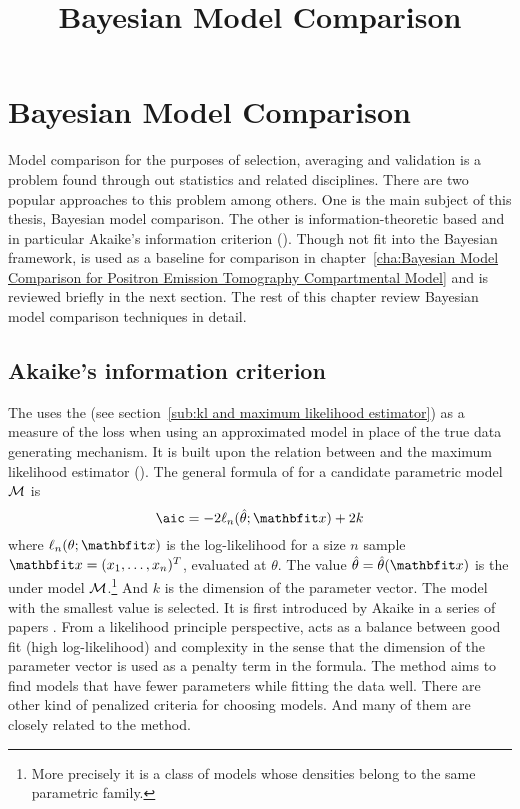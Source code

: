 \ifx\inthesis\undefined %

\title{Bayesian Model Comparison}

\maketitle
\else %
\chapter{Bayesian Model Comparison}
\label{cha:Bayesian Model Comparison}
\fi %

Model comparison for the purposes of selection, averaging and validation is a
problem found through out statistics and related disciplines. There are two
popular approaches to this problem among others. One is the main subject of
this thesis, Bayesian model comparison. The other is information-theoretic
based and in particular Akaike's information criterion (\aic). Though not fit
into the Bayesian framework, \aic is used as a baseline for comparison in
chapter~\ref{cha:Bayesian Model Comparison for Positron Emission Tomography
  Compartmental Model} and is reviewed briefly in the next section. The rest
of this chapter review Bayesian model comparison techniques in detail.

\section{Akaike's information criterion}
\label{sec:Akaike's information criterion}

The \aic uses the \kl (see section~\ref{sub:kl and maximum likelihood
  estimator}) as a measure of the loss when using an approximated model in
place of the true data generating mechanism. It is built upon the relation
between \kl and the maximum likelihood estimator (\mle). The general formula
of \aic for a candidate parametric model $\mathcal{M}$ is
\begin{equation}
  \text{\aic} = -2\ell_n(\hat\theta;\bfx) + 2k
\end{equation}
where $\ell_n(\theta;\bfx)$ is the log-likelihood for a size $n$ sample
$\bfx=(x_1,\dots,x_n)^T$, evaluated at $\theta$. The value $\hat\theta = \hat\theta(\bfx)$
is the \mle under model $\mathcal{M}$.\footnote{More precisely it is a class of
  models whose densities belong to the same parametric family.} And $k$ is the
dimension of the parameter vector. The model with the smallest \aic value is
selected. It is first introduced by Akaike in a series of papers
\cite{Akaike:1973uc, Akaike:1974ih, Akaike:1977ul}. From a likelihood
principle perspective, \aic acts as a balance between good fit (high
log-likelihood) and complexity in the sense that the dimension of the
parameter vector is used as a penalty term in the formula.  The \aic method
aims to find models that have fewer parameters while fitting the data well.
There are other kind of penalized criteria for choosing models.  And many of
them are closely related to the \aic method.

